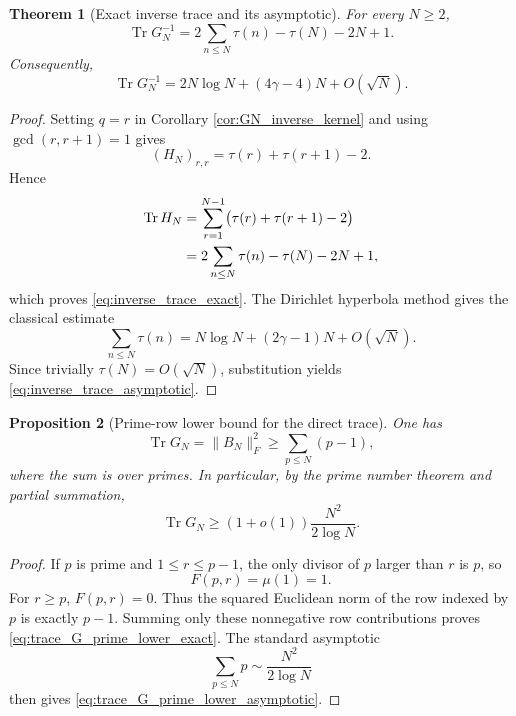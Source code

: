 \documentclass[11pt]{amsart}
\numberwithin{equation}{section}
\theoremstyle{plain}
\newtheorem{theorem}{Theorem}[section]
\newtheorem{proposition}[theorem]{Proposition}
\theoremstyle{definition}
\theoremstyle{remark}
\newcommand{\mob}{\mu}
\newcommand{\Tr}{\operatorname{Tr}}
\begin{document}
\begin{theorem}[Exact inverse trace and its asymptotic]
\label{thm:inverse_trace}
For every $N\ge2$,
\begin{equation}
\Tr G_N^{-1}
=2\sum_{n\le N}\tau(n)-\tau(N)-2N+1.
\label{eq:inverse_trace_exact}
\end{equation}
Consequently,
\begin{equation}
\Tr G_N^{-1}
=2N\log N+(4\gamma-4)N+O(\sqrt N).
\label{eq:inverse_trace_asymptotic}
\end{equation}
\end{theorem}

\begin{proof}
Setting $q=r$ in Corollary \ref{cor:GN_inverse_kernel} and using $\gcd(r,r+1)=1$ gives
\begin{equation}
(H_N)_{r,r}=\tau(r)+\tau(r+1)-2.
\label{eq:H_diagonal}
\end{equation}
Hence
\begin{align}
\Tr H_N
&=\sum_{r=1}^{N-1}\bigl(\tau(r)+\tau(r+1)-2\bigr)\notag\\
&=2\sum_{n\le N}\tau(n)-\tau(N)-2N+1,
\end{align}
which proves \eqref{eq:inverse_trace_exact}.  The Dirichlet hyperbola method gives the classical estimate
\begin{equation}
\sum_{n\le N}\tau(n)
=N\log N+(2\gamma-1)N+O(\sqrt N).
\end{equation}
Since trivially $\tau(N)=O(\sqrt N)$, substitution yields \eqref{eq:inverse_trace_asymptotic}.
\end{proof}

\begin{proposition}[Prime-row lower bound for the direct trace]
\label{prop:trace_G_lower}
One has
\begin{equation}
\Tr G_N=\|B_N\|_F^2
\ge \sum_{p\le N}(p-1),
\label{eq:trace_G_prime_lower_exact}
\end{equation}
where the sum is over primes.  In particular, by the prime number theorem and partial summation,
\begin{equation}
\Tr G_N\ge (1+o(1))\frac{N^2}{2\log N}.
\label{eq:trace_G_prime_lower_asymptotic}
\end{equation}
\end{proposition}

\begin{proof}
If $p$ is prime and $1\le r\le p-1$, the only divisor of $p$ larger than $r$ is $p$, so
\begin{equation}
F(p,r)=\mob(1)=1.
\end{equation}
For $r\ge p$, $F(p,r)=0$.  Thus the squared Euclidean norm of the row indexed by $p$ is exactly $p-1$.  Summing only these nonnegative row contributions proves \eqref{eq:trace_G_prime_lower_exact}.  The standard asymptotic
\begin{equation}
\sum_{p\le N}p\sim\frac{N^2}{2\log N}
\end{equation}
then gives \eqref{eq:trace_G_prime_lower_asymptotic}.
\end{proof}
\end{document}

